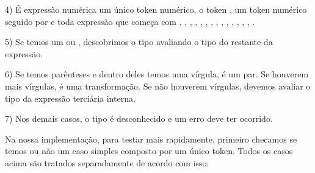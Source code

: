 {{{{{{4) É expressão numérica um único token numérico, o
token , um token numérico seguido
por \monoespaco{/} e toda expressão que começa
com , , , ,
, , , ,
, , , ,
, , .

5) Se temos um \monoespaco{+} ou \monoespaco{-}, descobrimos o tipo
avaliando o tipo do restante da expressão.

6) Se temos parênteses e dentro deles temos uma vírgula, é um par. Se
houverem mais vírgulas, é uma transformação. Se não houverem vírgulas,
devemos avaliar o tipo da expressão terciária interna.

7) Nos demais casos, o tipo é desconhecido e um erro deve ter ocorrido.

Na nossa implementação, para testar mais rapidamente, primeiro
checamos se temos ou não um caso simples composto por um único
token. Todos os casos acima são tratados separadamente de acordo com
isso:

}}}}}}
